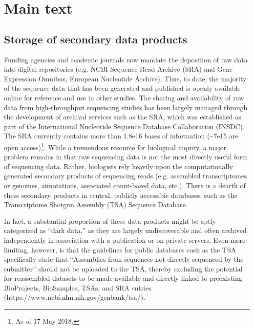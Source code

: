 \documentclass[a4paper,num-refs]{oup-contemporary}
\begin{document}
\section{Main text}
\subsection{Storage of secondary data products}
Funding agencies and academic journals now mandate the deposition of raw data into digital repositories (e.g. NCBI Sequence Read Archive (SRA) and Gene Expression Omnibus, European Nucleotide Archive). Thus, to date, the majority of the sequence data that has been generated and published is openly available online for reference and use in other studies. The sharing and availability of raw data from high-throughput sequencing studies has been largely managed through the development of archival services such as the SRA, which was established as part of the International Nucleotide Sequence Database Collaboration (INSDC)\cite{Shumway2009}. The SRA currently contains more than 1.8e16 bases of information (\textasciitilde7e15 are open access)\footnote{As of 17 May 2018.}. While a tremendous resource for biological inquiry, a major problem remains in that raw sequencing data is not the most directly useful form of sequencing data. Rather, biologists rely heavily upon the computationally generated secondary products of sequencing reads (e.g. assembled transcriptomes or genomes, annotations, associated count-based data, etc.). There is a dearth of these secondary products in central, publicly accessible databases, such as the  Transcriptome Shotgun Assembly (TSA) Sequence Database.

In fact, a substantial proportion of these data products might be aptly categorized as ``dark data,'' as they are largely undiscoverable and often archived independently in association with a publication or on private servers. Even more limiting, however, is that the guidelines for public databases such as the TSA specifically state that ``Assemblies from sequences not directly sequenced by the submitter'' should not be uploaded to the TSA, thereby excluding the potential for reassembled datasets to be made available and directly linked to preexisting BioProjects, BioSamples, TSAs, and SRA entries (https://www.ncbi.nlm.nih.gov/genbank/tsa/).
\end{document}
